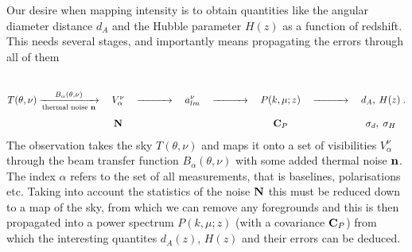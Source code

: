 \documentclass[prd,twocolumn,nofootinbib]{revtex4}
\begin{document}
Our desire when mapping \tcm{} intensity is to obtain quantities like the
angular diameter distance $d_A$ and the Hubble parameter $H(z)$ as a function of
redshift. This needs several stages, and importantly means propagating the
errors through all of them
\begin{equation}
  T(\theta, \nu) \xrightarrow[\text{thermal noise }\mathbf{n}]{B_\alpha(\theta,\nu)} \quad \begin{matrix} \\ \\V_\alpha^\nu \\ \\ \mathbf{N}\end{matrix} \quad
  \xrightarrow{\qquad\quad} \quad a_{lm}^\nu  \quad \xrightarrow{\qquad\quad} \quad \begin{matrix} \\ \\P(k, \mu; z) \\ \\ \mathbf{C}_P \end{matrix}  \quad \xrightarrow{\qquad\quad} \quad \begin{matrix} \\ \\  d_A,\: H(z)  \\ \\ \sigma_d, \; \sigma_H \end{matrix} \; .
\end{equation}
The observation takes the sky $T(\theta, \nu)$ and maps it onto a set of
visibilities $V_\alpha^\nu$ through the beam transfer function $B_\alpha(\theta,
\nu)$ with some added thermal noise $\mathbf{n}$. The index $\alpha$ refers to the set
of all measurements, that is baselines, polarisations etc. Taking into account
the statistics of the noise $\mathbf{N}$ this must be reduced down to a map of the sky,
from which we can remove any foregrounds and this is then propagated into a
power spectrum $P(k, \mu; z)$ (with a covariance $\mathbf{C}_P$) from which the
interesting quantites $d_A(z)$, $H(z)$ and their errors can be deduced.
\end{document}

